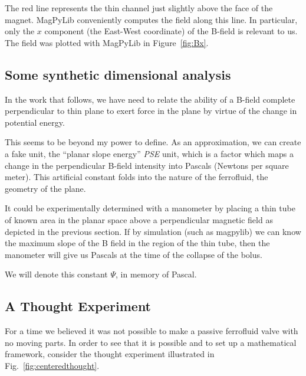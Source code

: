 \documentclass{asme2ej}
\begin{document}
The red line represents the thin channel just slightly above the face of
the magnet.
MagPyLib conveniently computes the field along this line. In particular,
only the $x$ component (the East-West coordinate) of the B-field is relevant to us.
The field was plotted with MagPyLib in Figure~\ref{fig:Bx}.

\subsection{Some synthetic dimensional analysis}

In the work that follows, we have need to relate the ability
of a B-field complete perpendicular to thin plane to exert
force in the plane by virtue of the change in potential energy.

This seems to be beyond my power to define.
As an approximation, we can create a fake unit, the
``planar slope energy'' {\em PSE} unit, which is a factor
which maps a change in the perpendicular B-field intensity
into Pascals (Newtons per square meter).
This artificial constant folds into the nature of the
ferrofluid, the geometry of the plane.

It could be experimentally determined with a manometer
by placing a thin tube of known area in the planar
space above a perpendicular magnetic field
as depicted in the previous section.
If by simulation (such as magpylib) we can know the
maximum slope of the B field in the region of the
thin tube, then the manometer will give us Pascals
at the time of the collapse of the bolus.

We will denote this constant $\Psi$, in memory of Pascal.

\subsection{ A Thought Experiment }

For a time we believed it was not possible to make a passive
ferrofluid valve with no moving parts.
In order to see that it is possible and to set up a mathematical
framework, consider the thought experiment illustrated in Fig.~\ref{fig:centeredthought}.
\end{document}
